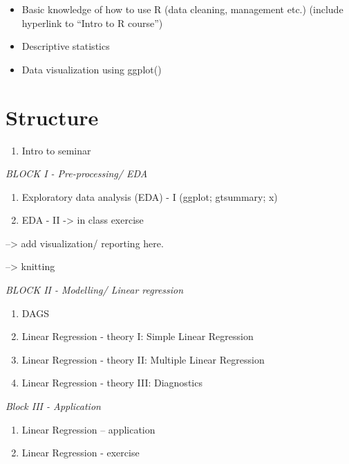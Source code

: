 \documentclass[
]{book}
\providecommand{\tightlist}{%
  \setlength{\itemsep}{0pt}\setlength{\parskip}{0pt}}
\begin{document}
\begin{itemize}
\tightlist
\item
  Basic knowledge of how to use R (data cleaning, management etc.) (include hyperlink to ``Intro to R course'')
\item
  Descriptive statistics
\item
  Data visualization using ggplot()
\end{itemize}

\hypertarget{structure}{%
\section{Structure}\label{structure}}

\begin{enumerate}
\def\labelenumi{\arabic{enumi}.}
\tightlist
\item
  Intro to seminar
\end{enumerate}

\emph{BLOCK I - Pre-processing/ EDA}

\begin{enumerate}
\def\labelenumi{\arabic{enumi}.}
\setcounter{enumi}{1}
\tightlist
\item
  Exploratory data analysis (EDA) - I (ggplot; gtsummary; x)
\item
  EDA - II -\textgreater{} in class exercise
\end{enumerate}

--\textgreater{} add visualization/ reporting here.

--\textgreater{} knitting

\emph{BLOCK II - Modelling/ Linear regression}

\begin{enumerate}
\def\labelenumi{\arabic{enumi}.}
\setcounter{enumi}{3}
\tightlist
\item
  DAGS
\item
  Linear Regression - theory I: Simple Linear Regression
\item
  Linear Regression - theory II: Multiple Linear Regression
\item
  Linear Regression - theory III: Diagnostics
\end{enumerate}

\emph{Block III - Application}

\begin{enumerate}
\def\labelenumi{\arabic{enumi}.}
\setcounter{enumi}{7}
\tightlist
\item
  Linear Regression -- application
\item
  Linear Regression - exercise
\end{enumerate}
\end{document}
